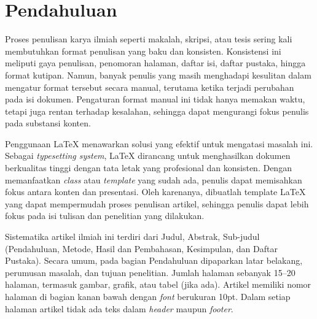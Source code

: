 \section{Pendahuluan}


Proses penulisan karya ilmiah seperti makalah, skripsi, atau tesis sering kali membutuhkan format penulisan yang baku dan konsisten. Konsistensi ini meliputi gaya penulisan, penomoran halaman, daftar isi, daftar pustaka, hingga format kutipan. Namun, banyak penulis yang masih menghadapi kesulitan dalam mengatur format tersebut secara manual, terutama ketika terjadi perubahan pada isi dokumen. Pengaturan format manual ini tidak hanya memakan waktu, tetapi juga rentan terhadap kesalahan, sehingga dapat mengurangi fokus penulis pada substansi konten.

Penggunaan LaTeX menawarkan solusi yang efektif untuk mengatasi masalah ini. Sebagai \textit{typesetting system}, LaTeX dirancang untuk menghasilkan dokumen berkualitas tinggi dengan tata letak yang profesional dan konsisten. Dengan memanfaatkan \textit{class} atau \textit{template} yang sudah ada, penulis dapat memisahkan fokus antara konten dan presentasi. Oleh karenanya, dibuatlah template LaTeX yang dapat mempermudah proses penulisan artikel, sehingga penulis dapat lebih fokus pada isi tulisan dan penelitian yang dilakukan.

Sistematika artikel ilmiah ini terdiri dari Judul, Abstrak, Sub-judul (Pendahuluan, Metode, Hasil dan Pembahasan, Kesimpulan, dan Daftar Pustaka). Secara umum, pada bagian Pendahuluan dipaparkan latar belakang, perumusan masalah, dan tujuan penelitian. Jumlah halaman sebanyak 15--20 halaman, termasuk gambar, grafik, atau tabel (jika ada). Artikel memiliki nomor halaman di bagian kanan bawah dengan \textit{font} berukuran 10pt. Dalam setiap halaman artikel tidak ada teks dalam \textit{header} maupun \textit{footer}.